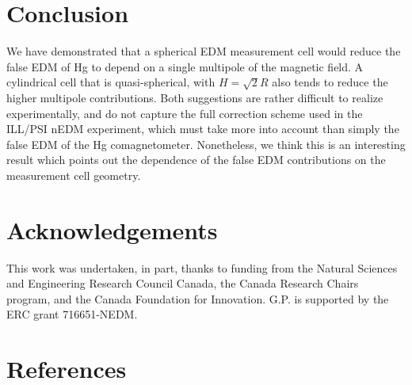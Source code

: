 \documentclass[preprint,12pt]{elsarticle}
\begin{document}
\section{Conclusion}

We have demonstrated that a spherical EDM measurement cell would
reduce the false EDM of Hg to depend on a single multipole of the
magnetic field.  A cylindrical cell that is quasi-spherical, with
$H=\sqrt{2}R$ also tends to reduce the higher multipole contributions.
Both suggestions are rather difficult to realize experimentally, and
do not capture the full correction scheme used in the ILL/PSI nEDM
experiment, which must take more into account than simply the false
EDM of the Hg comagnetometer.  Nonetheless, we think this is an
interesting result which points out the dependence of the false EDM
contributions on the measurement cell geometry.

\section*{Acknowledgements}

This work was undertaken, in part, thanks to funding from the Natural
Sciences and Engineering Research Council Canada, the Canada Research
Chairs program, and the Canada Foundation for Innovation.  G.P. is
supported by the ERC grant 716651-NEDM.

\section*{References}








\end{document}
